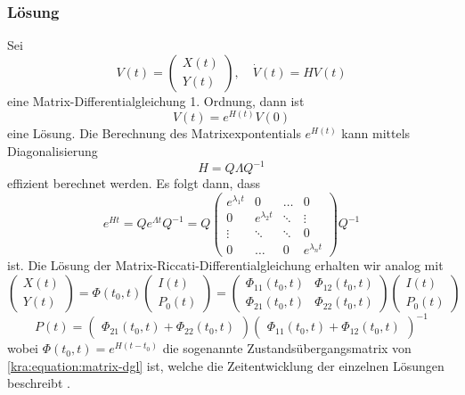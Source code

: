 \subsubsection{Lösung}
Sei
\[
    V(t)
    =
    \begin{pmatrix}
        X(t) \\
        Y(t)
    \end{pmatrix},
    \quad
    \dot{V}(t) = HV(t)
\]
eine Matrix-Differentialgleichung 1. Ordnung, dann ist
\[
    V(t) = e^{H(t)} V(0)
\]
eine Lösung.
Die Berechnung des Matrixexpontentials $e^{H(t)}$ kann mittels Diagonalisierung
\[
    H = Q \Lambda Q^{-1}
\]
effizient berechnet werden.
Es folgt dann, dass
\[
    e^{Ht}
    =
    Q
    e^{\Lambda t}
    Q^{-1}
    =
    Q
    \begin{pmatrix}
        e^{\lambda_1 t} & 0               & \dots  & 0               \\
        0               & e^{\lambda_2 t} & \ddots & \vdots          \\
        \vdots          & \ddots          & \ddots & 0               \\
        0               & \dots           & 0      & e^{\lambda_n t}
    \end{pmatrix}
    Q^{-1}
\]
ist. Die Lösung der Matrix-Riccati-Differentialgleichung erhalten wir analog mit
\begin{equation}
    \label{kra:matrixriccati-solution}
    \begin{pmatrix}
        X(t) \\
        Y(t)
    \end{pmatrix}
    =
    \Phi(t_0, t)
    \begin{pmatrix}
        I(t) \\
        P_0(t)
    \end{pmatrix}
    =
    \begin{pmatrix}
        \Phi_{11}(t_0, t) & \Phi_{12}(t_0, t) \\
        \Phi_{21}(t_0, t) & \Phi_{22}(t_0, t)
    \end{pmatrix}
    \begin{pmatrix}
        I(t) \\
        P_0(t)
    \end{pmatrix}
\end{equation}
\begin{equation}
    P(t) =
    \begin{pmatrix}
        \Phi_{21}(t_0, t) + \Phi_{22}(t_0, t)
    \end{pmatrix}
    \begin{pmatrix}
        \Phi_{11}(t_0, t) + \Phi_{12}(t_0, t)
    \end{pmatrix}
    ^{-1}
\end{equation}
wobei $\Phi(t_0, t) = e^{H(t - t_0)}$ die sogenannte Zustandsübergangsmatrix von \eqref{kra:equation:matrix-dgl} ist,
welche die Zeitentwicklung der einzelnen Lösungen beschreibt \cite{kra:kalmanisae}.
